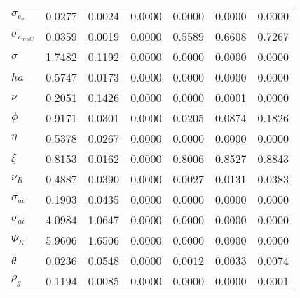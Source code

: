\begin{center}
\begin{longtable}{lcccccc}
$ \sigma_{{e_b}}       $	 & 	          0.0277	 & 	          0.0024	 & 	          0.0000	 & 	          0.0000	 & 	          0.0000	 & 	          0.0000 \\ 
$ \sigma_{{e_{muC}}}   $	 & 	          0.0359	 & 	          0.0019	 & 	          0.0000	 & 	          0.5589	 & 	          0.6608	 & 	          0.7267 \\ 
$ {\sigma}             $	 & 	          1.7482	 & 	          0.1192	 & 	          0.0000	 & 	          0.0000	 & 	          0.0000	 & 	          0.0000 \\ 
$ {ha}                 $	 & 	          0.5747	 & 	          0.0173	 & 	          0.0000	 & 	          0.0000	 & 	          0.0000	 & 	          0.0000 \\ 
$ \nu                  $	 & 	          0.2051	 & 	          0.1426	 & 	          0.0000	 & 	          0.0000	 & 	          0.0001	 & 	          0.0000 \\ 
$ {\phi}               $	 & 	          0.9171	 & 	          0.0301	 & 	          0.0000	 & 	          0.0205	 & 	          0.0874	 & 	          0.1826 \\ 
$ {\eta}               $	 & 	          0.5378	 & 	          0.0267	 & 	          0.0000	 & 	          0.0000	 & 	          0.0000	 & 	          0.0000 \\ 
$ \xi                  $	 & 	          0.8153	 & 	          0.0162	 & 	          0.0000	 & 	          0.8006	 & 	          0.8527	 & 	          0.8843 \\ 
$ {\nu_R}              $	 & 	          0.4887	 & 	          0.0390	 & 	          0.0000	 & 	          0.0027	 & 	          0.0131	 & 	          0.0383 \\ 
$ {\sigma_{ac}}        $	 & 	          0.1903	 & 	          0.0435	 & 	          0.0000	 & 	          0.0000	 & 	          0.0000	 & 	          0.0000 \\ 
$ {\sigma_{ai}}        $	 & 	          4.0984	 & 	          1.0647	 & 	          0.0000	 & 	          0.0000	 & 	          0.0000	 & 	          0.0000 \\ 
$ {\Psi_{K}}           $	 & 	          5.9606	 & 	          1.6506	 & 	          0.0000	 & 	          0.0000	 & 	          0.0000	 & 	          0.0000 \\ 
$ {\theta}             $	 & 	          0.0236	 & 	          0.0548	 & 	          0.0000	 & 	          0.0012	 & 	          0.0033	 & 	          0.0074 \\ 
$ {\rho_g}             $	 & 	          0.1194	 & 	          0.0085	 & 	          0.0000	 & 	          0.0000	 & 	          0.0000	 & 	          0.0001 \\ 

\end{longtable}
\end{center}
